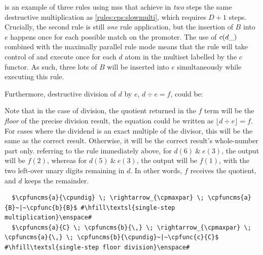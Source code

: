 is an example of three rules using \glspl{ms} that achieve in \emph{two} steps the same destructive multiplication as \cref{rules:cps:slowmulti}, which requires \(D + 1\) steps.  Crucially, the second rule is still \emph{one} rule application, but the insertion of \(B\) into \(e\) happens once for each possible match on the promoter.  The use of \(c(d\_)\) combined with the maximally parallel rule mode means that the rule will take control of and execute once for each \(d\) atom in the multiset labelled by the \(c\) functor.  As such, three lots of \(B\) will be inserted into \(e\) simultaneously while executing this rule.



Furthermore, destructive division of \(d\) by \(e\), \(d \div e = f\), could be:

Note that in the case of division, the quotient returned in the \(f\) term will be the \emph{floor} of the precise division result, \ie{} the equation could be written as \(\lfloor d \div e \rfloor = f\).  For cases where the dividend is an exact multiple of the divisor, this will be the same as the correct result.  Otherwise, it will be the correct result's whole-number part only.  \Eg{} referring to the rule immediately above, for \(d(6)~\&~e(3)\), the output will be \(f(2)\), whereas for \(d(5)~\&~e(3)\), the output will be \(f(1)\), with the two left-over unary digits remaining in \(d\).  In other words, \(f\) receives the quotient, and \(d\) keeps the remainder.

\lstset{xleftmargin=.5in, xrightmargin=.5in} 
\begin{lstlisting}
  $\cpfuncms{a}{\cpundig} \; \rightarrow_{\cpmaxpar} \; \cpfuncms{a}{B}~|~\cpfunc{b}{B}$ #\hfill\textsl{single-step multiplication}\enspace#
  $\cpfuncms{a}{C} \; \cpfuncms{b}{\,} \; \rightarrow_{\cpmaxpar} \; \cpfuncms{a}{\,} \; \cpfuncms{b}{\cpundig}~|~\cpfunc{c}{C}$ #\hfill\textsl{single-step floor division}\enspace#
\end{lstlisting}

